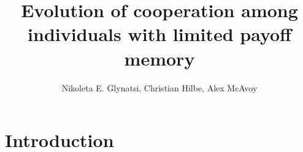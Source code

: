 \documentclass[11pt]{article}
\title{\bf  \sffamily \LARGE Evolution of cooperation among individuals with
limited payoff memory\\}
\date{}
\author{Nikoleta E. Glynatsi, Christian Hilbe, Alex McAvoy}
\theoremstyle{plainCl1}
\theoremstyle{plainCl2}
\begin{document}
\maketitle

\begin{abstract}

\end{abstract}

\section{Introduction}

\end{document}
